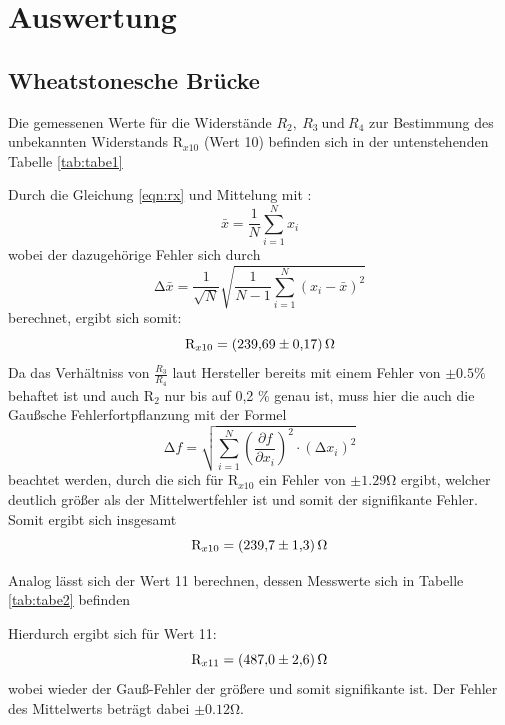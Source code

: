 \section{Auswertung}
\subsection{Wheatstonesche Brücke}
Die gemessenen Werte für die Widerstände $ R_2, \: R_3 \: \text{und} \: R_4 $ zur
Bestimmung des unbekannten Widerstands $\text{R}_{x10} $ (Wert 10) befinden sich in
der untenstehenden Tabelle \ref{tab:tabe1}

\noindent Durch die Gleichung \ref{eqn:rx}
und Mittelung mit :
\begin{equation}
  \bar{x} = \frac{1}{N} \sum_{i=1}^{N} x_i
\end{equation}
wobei der dazugehörige Fehler sich durch
\begin{equation}
  \increment \bar{x} = \frac{1}{\sqrt{N}} \sqrt{ \frac{1}{N-1} \sum_{i=1}^N
  (x_i - \bar{x})^2}
  \label{eqn:mitf}
\end{equation}
berechnet, ergibt sich somit:
\begin{equation*}
  \text{R}_{x10} = \SI{239.69 (17)}{\ohm}
\end{equation*}
Da das Verhältniss von $ \frac{R_3}{R_4} $ laut Hersteller bereits mit einem
Fehler von $ \pm 0.5 \% $  behaftet ist und auch $ \text{R}_2 $ nur bis auf
0,2 \% genau ist, muss hier die auch die Gaußsche
Fehlerfortpflanzung mit der Formel
\begin{equation}
  \increment f = \sqrt{ \sum_{i=1}^N \left( \frac{\partial f}{\partial x_i}\right)^2
  \cdot (\increment x_i)^2  }
  \label{eqn:gaus}
\end{equation}
beachtet werden, durch die sich für $ \text{R}_{x10} $ ein Fehler von $ \pm 1.29 \si{\ohm} $
ergibt, welcher deutlich größer als der Mittelwertfehler ist und somit der signifikante
Fehler. Somit ergibt sich insgesamt
\begin{equation*}
  \text{R}_{x10} = \SI{239.7 (13)}{\ohm}
\end{equation*}


Analog lässt sich der Wert 11 berechnen, dessen Messwerte sich in Tabelle
\ref{tab:tabe2} befinden

\noindent Hierdurch ergibt sich für Wert 11:
\begin{equation*}
  \text{R}_{x11} = \SI{487.0 (26)}{\ohm}
\end{equation*}
wobei wieder der Gauß-Fehler der größere und somit signifikante ist. Der Fehler
des Mittelwerts beträgt dabei $ \pm 0.12 \si{\ohm}$.

